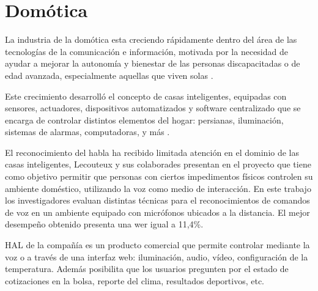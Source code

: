 \section{Dom\'otica}
\label{sec:domotica}

La industria de la dom\'otica esta creciendo r\'apidamente dentro del \'area de las tecnolog\'ias de la
comunicaci\'on e informaci\'on, motivada por la necesidad de ayudar a mejorar la autonom\'ia y bienestar de las personas
discapacitadas o de edad avanzada, especialmente aquellas que viven solas \cite{AlshuVoice2011}.

Este crecimiento desarroll\'o el concepto de casas inteligentes, equipadas con sensores, actuadores, dispositivos
automatizados y software centralizado que se encarga de controlar distintos elementos del hogar: persianas, iluminaci\'on,
sistemas de alarmas, computadoras, y m\'as \cite{LecouteuxSpeech2011, UshaWireless2012}.

El reconocimiento del habla ha recibido limitada atenci\'on en el dominio de las casas inteligentes, Lecouteux y
sus colaborades presentan en \cite{LecouteuxSpeech2011} el proyecto  que tiene como objetivo
permitir que personas con ciertos impedimentos f\'isicos controlen su ambiente dom\'estico, utilizando la voz
como medio de interacci\'on. En este trabajo los investigadores evaluan distintas t\'ecnicas para el reconocimientos
de comandos de voz en un ambiente equipado con micr\'ofonos ubicados a la distancia. El mejor desempe\~no obtenido
presenta una \gls{wer} igual a 11,4\%.

HAL \cite{HAL} de la compa\~n\'ia  es un producto comercial que permite controlar mediante
la voz o a trav\'es de una interfaz web: iluminaci\'on, audio, v\'ideo, configuraci\'on de la temperatura. Adem\'as
posibilita que los usuarios pregunten por el estado de cotizaciones en la bolsa, reporte del clima, resultados deportivos, etc.
